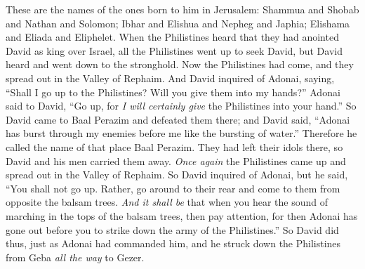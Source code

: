 \begin{biblechapter}
\verse These are the names of the ones born to him in Jerusalem: Shammua and Shobab and Nathan and Solomon;
\verse Ibhar and Elishua and Nepheg and Japhia;
\verse Elishama and Eliada and Eliphelet.
 When the Philistines heard that they had anointed David as king over Israel, all the Philistines went up to seek David, but David heard and went down to the stronghold.
\verse Now the Philistines had come, and they spread out in the Valley of Rephaim.
\verse And David inquired of Adonai, saying, “Shall I go up to the Philistines? Will you give them into my hands?” Adonai said to David, “Go up, for \textit{I will certainly give} the Philistines into your hand.”
\verse So David came to Baal Perazim and defeated them there; and David said, “Adonai has burst through my enemies before me like the bursting of water.” Therefore he called the name of that place Baal Perazim.
\verse They had left their idols there, so David and his men carried them away.
\verse \textit{Once again} the Philistines came up and spread out in the Valley of Rephaim.
\verse So David inquired of Adonai, but he said, “You shall not go up. Rather, go around to their rear and come to them from opposite the balsam trees.
\verse \textit{And it shall be} that when you hear the sound of marching in the tops of the balsam trees, then pay attention, for then Adonai has gone out before you to strike down the army of the Philistines.”
\verse So David did thus, just as Adonai had commanded him, and he struck down the Philistines from Geba \textit{all the way} to Gezer.
\end{biblechapter}

